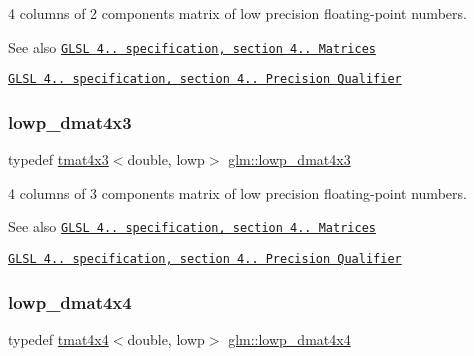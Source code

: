 4 columns of 2 components matrix of low precision floating-\/point numbers.

\begin{DoxySeeAlso}{See also}
\href{http://www.opengl.org/registry/doc/GLSLangSpec.4.20.8.pdf}{\tt G\+L\+SL 4.. specification, section 4.. Matrices} 

\href{http://www.opengl.org/registry/doc/GLSLangSpec.4.20.8.pdf}{\tt G\+L\+SL 4.. specification, section 4.. Precision Qualifier} 
\end{DoxySeeAlso}
\mbox{\label{group__core__precision_gac445c564f0c68d3520eca97ea755e618}} 
\subsubsection{\texorpdfstring{lowp\+\_\+dmat4x3}{lowp\_dmat4x3}}
{\footnotesize\ttfamily typedef \hyperlink{structglm_1_1tmat4x3}{tmat4x3}$<$double, lowp$>$ \hyperlink{group__core__precision_gac445c564f0c68d3520eca97ea755e618}{glm\+::lowp\+\_\+dmat4x3}}

4 columns of 3 components matrix of low precision floating-\/point numbers.

\begin{DoxySeeAlso}{See also}
\href{http://www.opengl.org/registry/doc/GLSLangSpec.4.20.8.pdf}{\tt G\+L\+SL 4.. specification, section 4.. Matrices} 

\href{http://www.opengl.org/registry/doc/GLSLangSpec.4.20.8.pdf}{\tt G\+L\+SL 4.. specification, section 4.. Precision Qualifier} 
\end{DoxySeeAlso}
\mbox{\label{group__core__precision_gad9168c20a21d1bfeb0f5d2ddfb98f519}} 
\subsubsection{\texorpdfstring{lowp\+\_\+dmat4x4}{lowp\_dmat4x4}}
{\footnotesize\ttfamily typedef \hyperlink{structglm_1_1tmat4x4}{tmat4x4}$<$double, lowp$>$ \hyperlink{group__core__precision_gad9168c20a21d1bfeb0f5d2ddfb98f519}{glm\+::lowp\+\_\+dmat4x4}}

